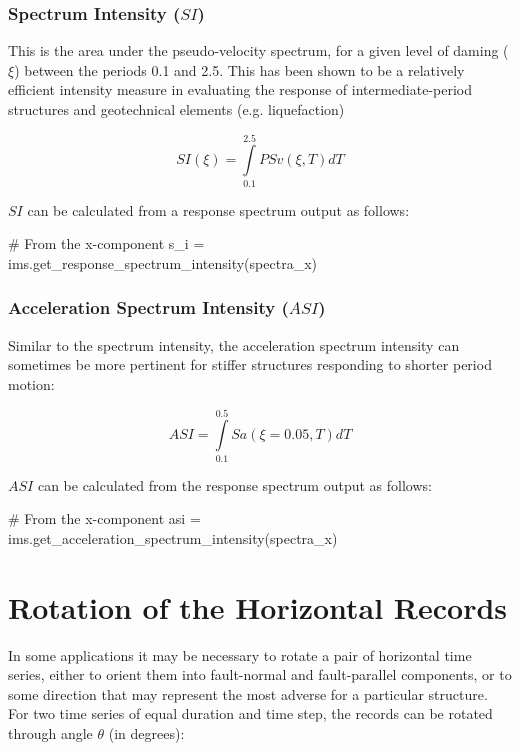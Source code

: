 \subsubsection{Spectrum Intensity ($SI$)}

This is the area under the pseudo-velocity spectrum, for a given level of daming ($\xi$) between the periods 0.1 and 2.5. This has been shown to be a relatively efficient intensity measure in evaluating the response of intermediate-period structures and geotechnical elements (e.g. liquefaction)

\begin{equation}
SI \left( {\xi} \right) = \int\limits_{0.1}^{2.5} PSv \left( {\xi, T} \right) dT
\end{equation}

$SI$ can be calculated from a response spectrum output as follows:

\begin{python}
# From the x-component
s_i = ims.get_response_spectrum_intensity(spectra_x)
\end{python}

\subsubsection{Acceleration Spectrum Intensity ($ASI$)}

Similar to the spectrum intensity, the acceleration spectrum intensity can sometimes be more pertinent for stiffer structures responding to shorter period motion:

\begin{equation}
ASI = \int\limits_{0.1}^{0.5} Sa \left( {\xi=0.05, T} \right) dT
\end{equation}

$ASI$ can be calculated from the response spectrum output as follows:

\begin{python}
# From the x-component
asi = ims.get_acceleration_spectrum_intensity(spectra_x)
\end{python}


\section{Rotation of the Horizontal Records}

In some applications it may be necessary to rotate a pair of horizontal time series, either to orient them into fault-normal and fault-parallel components, or to some direction that may represent the most adverse for a particular structure. For two time series of equal duration and time step, the records can be rotated through angle $\theta$ (in degrees):

